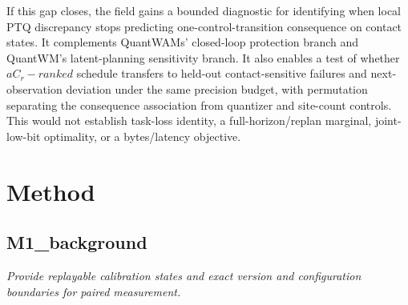 \documentclass[10pt,a4paper]{article}
\begin{document}
If this gap closes, the field gains a bounded diagnostic for identifying when local PTQ discrepancy stops predicting one-control-transition consequence on contact states. It complements QuantWAMs' closed-loop protection branch and QuantWM's latent-planning sensitivity branch. It also enables a test of whether \(a C_{r}-ranked\) schedule transfers to held-out contact-sensitive failures and next-observation deviation under the same precision budget, with permutation separating the consequence association from quantizer and site-count controls. This would not establish task-loss identity, a full-horizon/replan marginal, joint-low-bit optimality, or a bytes/latency objective.
\section*{Method}
\subsection*{M1\_background}
\emph{Provide replayable calibration states and exact version and configuration boundaries for paired measurement.}
\end{document}
